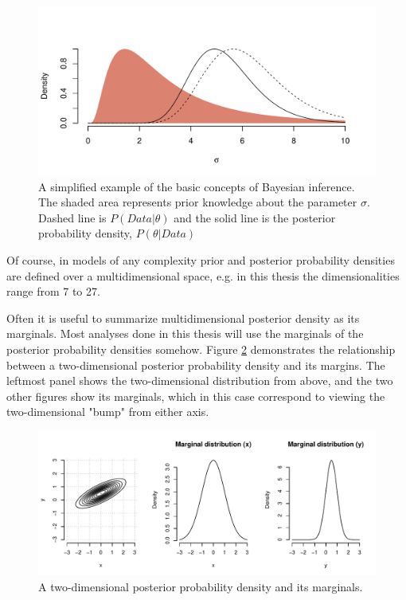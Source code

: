 \documentclass{article}\usepackage{knitr}
\begin{document}
\begin{figure}
\centering
\begin{knitrout}
\color{fgcolor}
\includegraphics[width=\maxwidth]{figure/unnamed-chunk-12-1} 

\end{knitrout}
\caption{A simplified example of the basic concepts of Bayesian inference. The shaded area represents prior knowledge about the parameter $\sigma$. Dashed line is $P(Data | \theta)$ and the solid line is the posterior probability density, $P(\theta | Data)$}
\label{fig:priorpost}
\end{figure}

Of course, in models of any complexity prior and posterior probability densities are defined over a multidimensional space, e.g. in this thesis the dimensionalities range from 7 to 27. 

Often it is useful to summarize multidimensional posterior density as its marginals. Most analyses done in this thesis will use the marginals of  the posterior probability densities somehow. Figure \ref{fig:marginals} demonstrates the relationship between a two-dimensional posterior probability density and its margins. The leftmost panel shows the two-dimensional distribution from above, and the two other figures show its marginals, which in this case correspond to viewing the two-dimensional "bump" from either axis. 

\begin{figure}
\centering
\begin{knitrout}
\color{fgcolor}
\includegraphics[width=\maxwidth]{figure/unnamed-chunk-13-1} 

\end{knitrout}
\caption{A two-dimensional posterior probability density and its marginals. }
\label{fig:marginals}
\end{figure}
\end{document}
